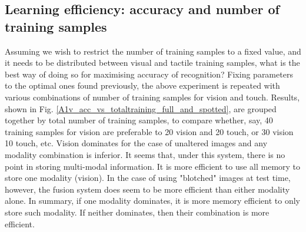 \documentclass[]{article}
\begin{document}
\subsection{Learning efficiency: accuracy and number of training samples}
Assuming we wish to restrict the number of training samples to a fixed value, and it needs to be distributed between visual and tactile training samples, what is the best way of doing so for maximising accuracy of recognition?
Fixing parameters to the optimal ones found previously, the above experiment is repeated with various combinations of number of training samples for vision and touch. Results, shown in Fig. \ref{A1v_acc_vs_totaltraining_full_and_spotted}, are grouped together by total number of training samples, to compare whether, say, 40 training samples for vision are preferable to 20 vision and 20 touch, or 30 vision 10 touch, etc. Vision dominates for the case of unaltered images and any modality combination is inferior. It seems that, under this system, there is no point in storing multi-modal information. It is more efficient to use all memory to store one modality (vision). In the case of using "blotched" images at test time, however, the fusion system does seem to be more efficient than either modality alone. In summary, if one modality dominates, it is more memory efficient to only store such modality. If neither dominates, then their combination is more efficient.
\begin{figure}
	\centering
	\end{figure}
	


\end{document}
